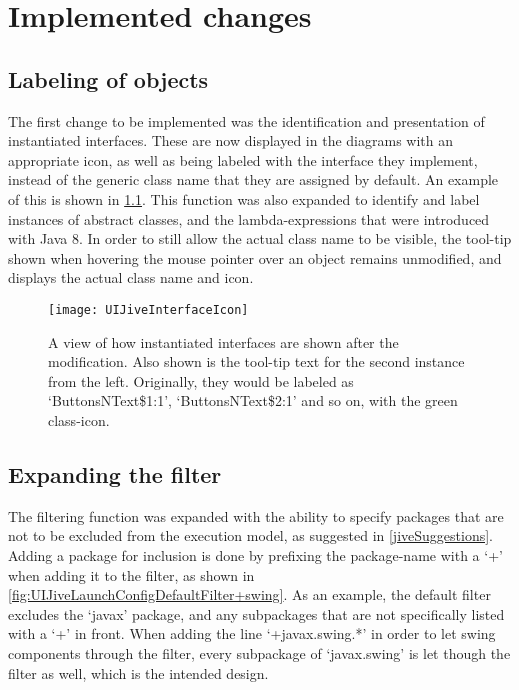 \chapter{Implemented changes}\label{jiveImpl}%

\section{Labeling of objects}\label{implLabel}

The first change to be implemented was the identification and presentation of instantiated interfaces.
These are now displayed in the diagrams with an appropriate icon, as well as being labeled with the interface they implement, instead of the generic class name that they are assigned by default.
An example of this is shown in \cref{fig:JiveNewIcon}.
This function was also expanded to identify and label instances of abstract classes, and the lambda-expressions that were introduced with Java 8.
In order to still allow the actual class name to be visible, the tool-tip shown when hovering the mouse pointer over an object remains unmodified, and displays the actual class name and icon.
\begin{figure}[H]
	\centering
	\texttt{[image: UIJiveInterfaceIcon]}
	\caption[A view of how instantiated interfaces are shown after the modification.]{A view of how instantiated interfaces are shown after the modification. Also shown is the tool-tip text for the second instance from the left. Originally, they would be labeled as `ButtonsNText\$1:1', `ButtonsNText\$2:1' and so on, with the green class-icon.}
	\label{fig:JiveNewIcon}
\end{figure}

\section{Expanding the filter}\label{implFilter}

The filtering function was expanded with the ability to specify packages that are not to be excluded from the execution model, as suggested in \cref{jiveSuggestions}.
Adding a package for inclusion is done by prefixing the package-name with a `+' when adding it to the filter, as shown in \cref{fig:UIJiveLaunchConfigDefaultFilter+swing}.
As an example, the default filter excludes the `javax' package, and any subpackages that are not specifically listed with a `+' in front.
When adding the line `+javax.swing.*' in order to let swing components through the filter, every subpackage of `javax.swing' is let though the filter as well, which is the intended design.

